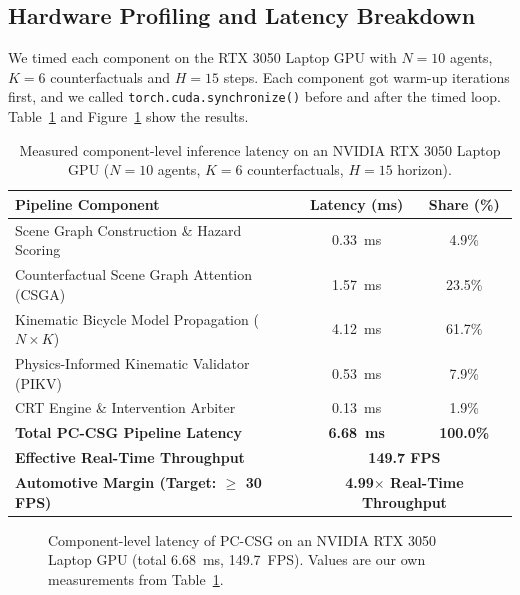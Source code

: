 \documentclass[preprint,12pt]{elsarticle}
\begin{document}
\subsection{Hardware Profiling and Latency Breakdown}
We timed each component on the RTX 3050 Laptop GPU with $N = 10$ agents, $K = 6$ counterfactuals and $H = 15$ steps. Each component got warm-up iterations first, and we called \texttt{torch.cuda.synchronize()} before and after the timed loop. Table~\ref{table_latency} and Figure~\ref{fig_latency} show the results.

\begin{table}[H]
\caption{Measured component-level inference latency on an NVIDIA RTX 3050 Laptop GPU ($N=10$ agents, $K=6$ counterfactuals, $H=15$ horizon).}
\centering
\label{table_latency}
\begin{tabular}{l|c|c}
\hline
\textbf{Pipeline Component} & \textbf{Latency (ms)} & \textbf{Share (\%)} \\
\hline
Scene Graph Construction \& Hazard Scoring & 0.33~ms & 4.9\% \\
Counterfactual Scene Graph Attention (CSGA) & 1.57~ms & 23.5\% \\
Kinematic Bicycle Model Propagation ($N \times K$) & 4.12~ms & 61.7\% \\
Physics-Informed Kinematic Validator (PIKV) & 0.53~ms & 7.9\% \\
CRT Engine \& Intervention Arbiter & 0.13~ms & 1.9\% \\
\hline
\textbf{Total PC-CSG Pipeline Latency} & \textbf{6.68~ms} & \textbf{100.0\%} \\
\textbf{Effective Real-Time Throughput} & \multicolumn{2}{c}{\textbf{149.7 FPS}} \\
\textbf{Automotive Margin (Target: $\ge$ 30 FPS)} & \multicolumn{2}{c}{\textbf{4.99$\times$ Real-Time Throughput}} \\
\hline
\end{tabular}
\end{table}

\begin{figure}[H]
\centering
{}
\captionsetup{singlelinecheck = false, format= hang, justification=justified, font=footnotesize, labelsep=space}
\caption{Component-level latency of PC-CSG on an NVIDIA RTX 3050 Laptop GPU (total 6.68~ms, 149.7~FPS). Values are our own measurements from Table~\ref{table_latency}.}
\label{fig_latency}
\end{figure}
\end{document}
